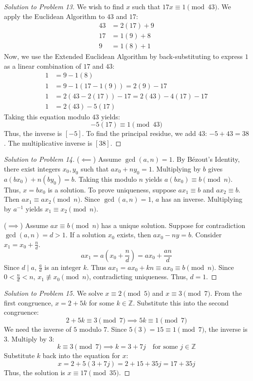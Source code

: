 \documentclass[11pt, a4paper]{article}
\theoremstyle{definition}
\theoremstyle{remark}
\newcommand{\Z}{\mathbb{Z}}
\begin{document}
\begin{proof}[Solution to Problem 13]
We wish to find $x$ such that $17x \equiv 1 \pmod{43}$. We apply the Euclidean Algorithm to $43$ and $17$:
\begin{align*}
43 &= 2(17) + 9 \\
17 &= 1(9) + 8 \\
9 &= 1(8) + 1
\end{align*}
Now, we use the Extended Euclidean Algorithm by back-substituting to express $1$ as a linear combination of $17$ and $43$:
\begin{align*}
1 &= 9 - 1(8) \\
1 &= 9 - 1(17 - 1(9)) = 2(9) - 17 \\
1 &= 2(43 - 2(17)) - 17 = 2(43) - 4(17) - 17 \\
1 &= 2(43) - 5(17)
\end{align*}
Taking this equation modulo $43$ yields:
\[ -5(17) \equiv 1 \pmod{43} \]
Thus, the inverse is $[-5]$. To find the principal residue, we add $43$: $-5 + 43 = 38$. The multiplicative inverse is $[38]$.
\end{proof}

\begin{proof}[Solution to Problem 14]
($\impliedby$) Assume $\gcd(a,n) = 1$. By Bézout's Identity, there exist integers $x_0, y_0$ such that $ax_0 + ny_0 = 1$. Multiplying by $b$ gives $a(bx_0) + n(by_0) = b$. Taking this modulo $n$ yields $a(bx_0) \equiv b \pmod n$. Thus, $x = bx_0$ is a solution. To prove uniqueness, suppose $ax_1 \equiv b$ and $ax_2 \equiv b$. Then $ax_1 \equiv ax_2 \pmod n$. Since $\gcd(a,n)=1$, $a$ has an inverse. Multiplying by $a^{-1}$ yields $x_1 \equiv x_2 \pmod n$.

($\implies$) Assume $ax \equiv b \pmod n$ has a unique solution. Suppose for contradiction $\gcd(a,n) = d > 1$. If a solution $x_0$ exists, then $ax_0 - ny = b$. Consider $x_1 = x_0 + \frac{n}{d}$. 
\[ ax_1 = a\left(x_0 + \frac{n}{d}\right) = ax_0 + \frac{an}{d} \]
Since $d \mid a$, $\frac{a}{d}$ is an integer $k$. Thus $ax_1 = ax_0 + kn \equiv ax_0 \equiv b \pmod n$. Since $0 < \frac{n}{d} < n$, $x_1 \not\equiv x_0 \pmod n$, contradicting uniqueness. Thus, $d=1$.
\end{proof}

\begin{proof}[Solution to Problem 15]
We solve $x \equiv 2 \pmod 5$ and $x \equiv 3 \pmod 7$.
From the first congruence, $x = 2 + 5k$ for some $k \in \Z$.
Substitute this into the second congruence:
\[ 2 + 5k \equiv 3 \pmod 7 \implies 5k \equiv 1 \pmod 7 \]
We need the inverse of $5$ modulo $7$. Since $5(3) = 15 \equiv 1 \pmod 7$, the inverse is $3$.
Multiply by $3$:
\[ k \equiv 3 \pmod 7 \implies k = 3 + 7j \quad \text{for some } j \in \Z \]
Substitute $k$ back into the equation for $x$:
\[ x = 2 + 5(3 + 7j) = 2 + 15 + 35j = 17 + 35j \]
Thus, the solution is $x \equiv 17 \pmod{35}$.
\end{proof}
\end{document}
